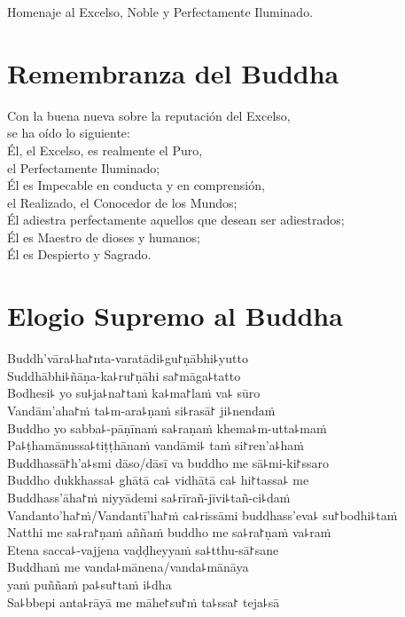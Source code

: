 Homenaje al Excelso, Noble y Perfectamente Iluminado.


\nextChapterUseDelegatedPageNumber

\chapter{Remembranza del Buddha}

\begin{leader}
\end{leader}

Con la buena nueva sobre la reputación del Excelso,\\
\vin se ha oído lo siguiente:\\
Él, el Excelso, es realmente el Puro,\\
\vin el Perfectamente Iluminado;\\
Él es Impecable en conducta y en comprensión,\\
\vin el Realizado, el Conocedor de los Mundos;\\
Él adiestra perfectamente aquellos que desean ser adiestrados;\\
Él es Maestro de dioses y humanos;\\
Él es Despierto y Sagrado.

\clearpage

\chapter*{Elogio Supremo al Buddha}

\delegateSetUseNext

\begin{leader}
\end{leader}

Buddh'vāra꜕ha꜓nta-varatādi꜕gu꜓ṇābhi꜕yutto\\
Suddhābhi꜕ñāṇa-ka꜕ru꜓ṇāhi sa꜓māga꜕tatto\\
Bodhesi꜕ yo su꜕ja꜕na꜓taṁ ka꜕ma꜓laṁ va꜕ sūro\\
Vandām'aha꜓ṁ ta꜕m-ara꜕ṇaṁ si꜕rasā꜓ ji꜕nendaṁ\\
Buddho yo sabba꜕-pāṇīnaṁ sa꜕raṇaṁ khema꜕m-utta꜕maṁ\\
Pa꜕ṭhamānussa꜕tiṭṭhānaṁ vandāmi꜕ taṁ si꜓ren'a꜕haṁ\\
Buddhassā꜓h'a꜕smi dāso/dāsī va buddho me sā꜕mi-ki꜓ssaro\\
Buddho dukkhassa꜕ ghātā ca꜕ vidhātā ca꜕ hi꜓tassa꜕ me\\
Buddhass'āha꜓ṁ niyyādemi sa꜕rīrañ-jīvi꜕tañ-ci꜕daṁ\\
Vandanto'ha꜓ṁ/Vandantī'ha꜓ṁ ca꜕rissāmi buddhass'eva꜕ su꜓bodhi꜕taṁ\\
Natthi me sa꜕ra꜓ṇaṁ aññaṁ buddho me sa꜕ra꜓ṇaṁ va꜕raṁ\\
Etena sacca꜕-vajjena vaḍḍheyyaṁ sa꜕tthu-sā꜓sane\\
Buddhaṁ me vanda꜕mānena/vanda꜕mānāya\\
\vin yaṁ puññaṁ pa꜕su꜓taṁ i꜕dha\\
Sa꜕bbepi anta꜕rāyā me māhe꜓su꜓ṁ ta꜕ssa꜓ teja꜕sā

